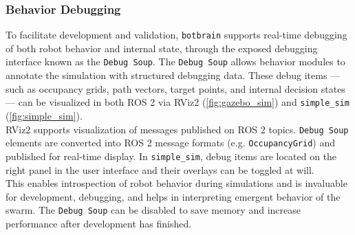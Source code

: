 \subsubsection{Behavior Debugging}
To facilitate development and validation, \texttt{botbrain} supports real-time debugging of both robot behavior and internal state, through the exposed debugging interface known as the \texttt{Debug Soup}. The \texttt{Debug Soup} allows behavior modules to annotate the simulation with structured debugging data. These debug items --- such as occupancy grids, path vectors, target points, and internal decision states --- can be visualized in both ROS 2 via RViz2 (\cref{fig:gazebo_sim}) and \texttt{simple\_sim} (\cref{fig:simple_sim}). \\

RViz2 supports visualization of messages published on ROS 2 topics. \texttt{Debug Soup} elements are converted into ROS 2 message formats (e.g. \texttt{OccupancyGrid}) and published for real-time display. In \texttt{simple\_sim}, debug items are located on the right panel in the user interface and their overlays can be toggled at will. \\

This enables introspection of robot behavior during simulations and is invaluable for development, debugging, and helps in interpreting emergent behavior of the swarm. The \texttt{Debug Soup} can be disabled to save memory and increase performance after development has finished.
